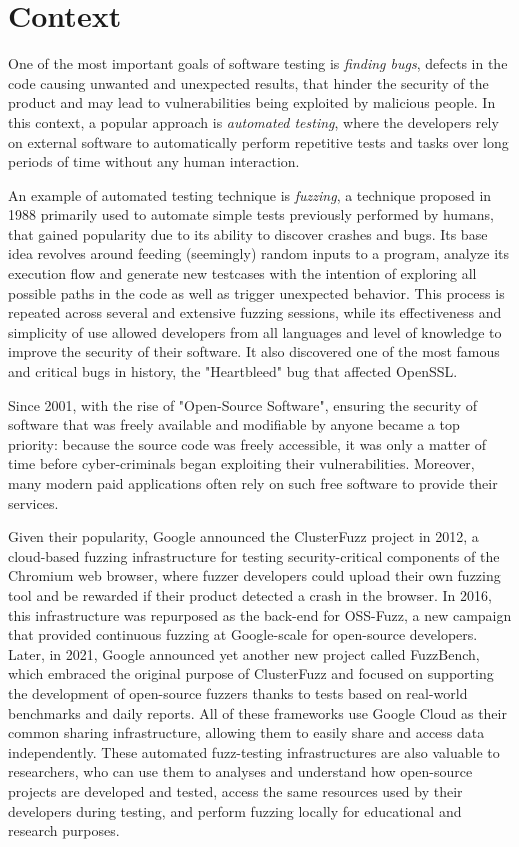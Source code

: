 \section{Context}
One of the most important goals of software testing is \textit{finding bugs}, defects in the code causing unwanted and unexpected results, that hinder the security of the product and may lead to vulnerabilities being exploited by malicious people. In this context, a popular approach is \textit{automated testing}, where the developers rely on external software to automatically perform repetitive tests and tasks over long periods of time without any human interaction.

An example of automated testing technique is \textit{fuzzing}, a technique proposed in 1988 primarily used to automate simple tests previously performed by humans, that gained popularity due to its ability to discover crashes and bugs. Its base idea revolves around feeding (seemingly) random inputs to a program, analyze its execution flow and generate new testcases with the intention of exploring all possible paths in the code as well as trigger unexpected behavior. This process is repeated across several and extensive fuzzing sessions, while its effectiveness and simplicity of use allowed developers from all languages and level of knowledge to improve the security of their software. It also discovered one of the most famous and critical bugs in history, the "Heartbleed" bug that affected OpenSSL.

Since 2001, with the rise of "Open-Source Software", ensuring the security of software that was freely available and modifiable by anyone became a top priority: because the source code was freely accessible, it was only a matter of time before cyber-criminals began exploiting their vulnerabilities. Moreover, many modern paid applications often rely on such free software to provide their services. 

Given their popularity, Google announced the ClusterFuzz project in 2012, a cloud-based fuzzing infrastructure for testing security-critical components of the Chromium web browser, where fuzzer developers could upload their own fuzzing tool and be rewarded if their product detected a crash in the browser. In 2016, this infrastructure was repurposed as the back-end for OSS-Fuzz, a new campaign that provided continuous fuzzing at Google-scale for open-source developers. Later, in 2021, Google announced yet another new project called FuzzBench, which embraced the original purpose of ClusterFuzz and focused on supporting the development of open-source fuzzers thanks to tests based on real-world benchmarks and daily reports. All of these frameworks use Google Cloud as their common sharing infrastructure, allowing them to easily share and access data independently. These automated fuzz-testing infrastructures are also valuable to researchers, who can use them to analyses and understand how open-source projects are developed and tested, access the same resources used by their developers during testing, and perform fuzzing locally for educational and research purposes.

